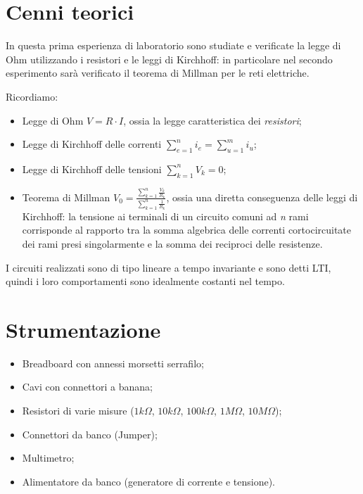     \section{Cenni teorici}
    In questa prima esperienza di laboratorio sono studiate e verificate la legge di Ohm utilizzando i resistori e le leggi di Kirchhoff: in particolare nel secondo esperimento
    sarà verificato il teorema di Millman per le reti elettriche. \par
    Ricordiamo:
    \begin{itemize}
        \item Legge di Ohm $V = R \cdot I$, ossia la legge caratteristica dei \textit{resistori};
        \item Legge di Kirchhoff delle correnti $\sum_{e = 1}^{n} i_e = \sum_{u = 1}^{m} i_u $;
        \item Legge di Kirchhoff delle tensioni $\sum_{k = 1}^{n} V_k = 0 $;
        \item Teorema di Millman $V_0 = \frac{\sum_{k = 1}^{n} \frac{V_k}{R_k} }{\sum_{k = 1}^{n} \frac{1}{R_k} }$, ossia una diretta conseguenza delle leggi di Kirchhoff: la tensione ai terminali di un circuito comuni ad \textit{n} rami
                corrisponde al rapporto tra la somma algebrica delle correnti cortocircuitate dei rami presi singolarmente e la somma dei reciproci delle resistenze.
    \end{itemize}
    I circuiti realizzati sono di tipo lineare a tempo invariante e sono detti LTI, quindi i loro comportamenti sono idealmente costanti nel tempo.
    
    
    \newpage
    \section{Strumentazione}
    \begin{itemize}
        \item Breadboard con annessi morsetti serrafilo;
        \item Cavi con connettori a banana;
        \item Resistori di varie misure ($1k\Omega$, $10k\Omega$, $100k\Omega$, $1M\Omega$, $10M\Omega$);
        \item Connettori da banco (Jumper);
        \item Multimetro;
        \item Alimentatore da banco (generatore di corrente e tensione).
    \end{itemize}


